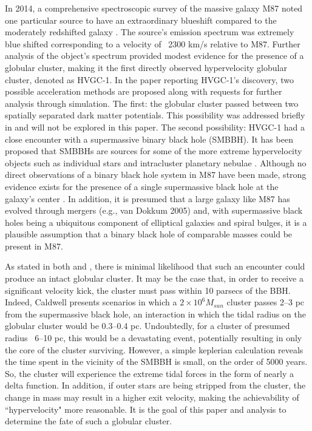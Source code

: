 \documentclass{aastex62}
\begin{document}
In 2014, a comprehensive spectroscopic survey of the massive galaxy M87 noted one particular source to have an extraordinary blueshift compared to the moderately redshifted galaxy \citep{cald14}. The source's emission spectrum was extremely blue shifted corresponding to a velocity of ~2300 km/s relative to M87. Further analysis of the object's spectrum provided modest evidence for the presence of a globular cluster, making it the first directly observed hypervelocity globular cluster, denoted as HVGC-1. In the paper reporting HVGC-1's discovery, two possible acceleration methods are proposed along with requests for further analysis through simulation. The first: the globular cluster passed between two spatially separated dark matter potentials. This possibility was addressed briefly in \citet{sam15} and will not be explored in this paper. The second possibility: HVGC-1 had a close encounter with a supermassive binary black hole (SMBBH). It has been proposed that SMBBHs are sources for some of the more extreme hypervelocity objects such as individual stars \citep{yutre03} and intracluster planetary nebulae \citep{hol05}. Although no direct observations of a binary black hole system in M87 have been made, strong evidence exists for the presence of a single supermassive black hole at the galaxy's center \citep{geb11}. In addition, it is presumed that a large galaxy like M87 has evolved through mergers (e.g., van Dokkum 2005) and, with supermassive black holes being a ubiquitous component of elliptical galaxies and spiral bulges, it is a plausible assumption that a binary black hole of comparable masses could be present in M87. 

As stated in both \citet{cald14} and \citet{sam15}, there is minimal likelihood that such an encounter could produce an intact globular cluster. It may be the case that, in order to receive a significant velocity kick, the cluster must pass within 10 parsecs of the BBH. Indeed, Caldwell presents scenarios in which a $2\times10^6M_{sun}$ cluster passes 2--3 pc from the supermassive black hole, an interaction in which the tidal radius on the globular cluster would be 0.3--0.4 pc. Undoubtedly, for a cluster of presumed radius ~6--10 pc, this would be a devastating event, potentially resulting in only the core of the cluster surviving. However, a simple keplerian calculation reveals the time spent in the vicinity of the SMBBH is small, on the order of 5000 years. So, the cluster will experience the extreme tidal forces in the form of nearly a delta function. In addition, if outer stars are being stripped from the cluster, the change in mass may result in a higher exit velocity, making the achievability of ``hypervelocity" more reasonable. It is the goal of this paper and analysis to determine the fate of such a globular cluster. 
\end{document}

